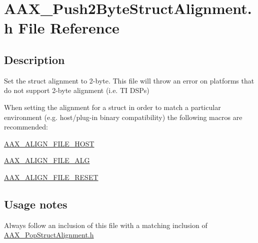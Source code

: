 \hypertarget{a00665}{}\section{A\+A\+X\+\_\+\+Push2\+Byte\+Struct\+Alignment.\+h File Reference}
\label{a00665}


\subsection{Description}
Set the struct alignment to 2-\/byte. This file will throw an error on platforms that do not support 2-\/byte alignment (i.\+e. TI D\+S\+Ps) 

When setting the alignment for a struct in order to match a particular environment (e.\+g. host/plug-\/in binary compatibility) the following macros are recommended\+: \begin{DoxyItemize}
\item \mbox{\hyperlink{a00392_acbef7ed7d077bc9812cb56417e1ad325}{A\+A\+X\+\_\+\+A\+L\+I\+G\+N\+\_\+\+F\+I\+L\+E\+\_\+\+H\+O\+ST}} \item \mbox{\hyperlink{a00392_a8fbeac3c5db5ac694e85a021ed74dc9e}{A\+A\+X\+\_\+\+A\+L\+I\+G\+N\+\_\+\+F\+I\+L\+E\+\_\+\+A\+LG}} \item \mbox{\hyperlink{a00392_a8aaaefcc3d87025e84d5ccb99b650a87}{A\+A\+X\+\_\+\+A\+L\+I\+G\+N\+\_\+\+F\+I\+L\+E\+\_\+\+R\+E\+S\+ET}}\end{DoxyItemize}
\hypertarget{a00665_AAX_Push2ByteStructAlignment_usagenotes}{}\subsection{Usage notes}\label{a00665_AAX_Push2ByteStructAlignment_usagenotes}
\begin{DoxyItemize}
\item Always follow an inclusion of this file with a matching inclusion of \mbox{\hyperlink{a00653}{A\+A\+X\+\_\+\+Pop\+Struct\+Alignment.\+h}}\end{DoxyItemize}
